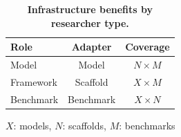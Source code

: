 \begin{table}[t]
\centering
\caption{\textbf{Infrastructure benefits by researcher type.}}
\label{tab:researcher_benefits}
\small
\begin{tabular}{@{}lcc@{}}
\toprule
\textbf{Role} & \textbf{Adapter} & \textbf{Coverage} \\
\midrule
Model & Model & $N{\times}M$ \\
Framework & Scaffold & $X{\times}M$ \\
Benchmark & Benchmark & $X{\times}N$ \\
\bottomrule
\end{tabular}
\vspace{1mm}
\begin{flushleft}
\scriptsize $X$: models, $N$: scaffolds, $M$: benchmarks
\end{flushleft}
\end{table}
